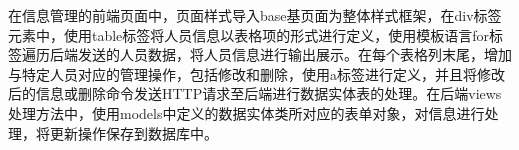 


在信息管理的前端页面中，页面样式导入base基页面为整体样式框架，在div标签元素中，使用table标签将人员信息以表格项的形式进行定义，使用模板语言for标签遍历后端发送的人员数据，将人员信息进行输出展示。在每个表格列末尾，增加与特定人员对应的管理操作，包括修改和删除，使用a标签进行定义，并且将修改后的信息或删除命令发送HTTP请求至后端进行数据实体表的处理。在后端views处理方法中，使用models中定义的数据实体类所对应的表单对象，对信息进行处理，将更新操作保存到数据库中。

